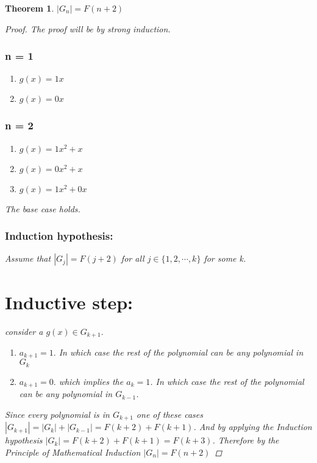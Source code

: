 \documentclass{article}
\newtheorem{theorem}{Theorem}
\begin{document}
    
    

    
    \begin{theorem}
        $|G_n|= F(n+2)$ 
        \begin{proof}
            The proof will be by strong induction.
            \subsubsection*{n = 1}
                \begin{enumerate}
                    \item $g(x) = 1x$
                    \item $g(x) = 0x$
                \end{enumerate}
            \subsubsection*{n = 2}
                \begin{enumerate}
                    \item $g(x) =  1x^2 + x $
                    \item $g(x) =  0x^2 + x $
                    \item $g(x) = 1x^2 + 0x$
                \end{enumerate}
            The base case holds. 
        \subsubsection*{Induction hypothesis:}
                Assume that $|G_j| = F(j+2)$ for all $j \in \{1,2, \cdots, k\} $ for some k.
        \section*{Inductive step:}
                consider a $g(x) \in G_{k+1}$.
                \begin{enumerate}[label= \textbf{Case \arabic*.}]
                    \item $a_{k+1}=1.$ In which case the rest of the polynomial can be any polynomial in $G_k$
                    \item  $a_{k+1}=0.$ which implies the $a_k=1$. In which case the rest of the polynomial can be any polynomial in $G_{k-1}$.
                \end{enumerate}
                Since every polynomial is in $G_{k+1}$ one of these cases $|G_{k+1}| = |G_{k}| + |G_{k-1}| = F(k+2) + F(k+1)$.
                And by applying the Induction hypothesis $|G_k| = F(k+2) + F(k+1)= F(k+3)$.
            Therefore by the Principle of Mathematical Induction $|G_n| = F(n+2)$

        \end{proof}
        
    \end{theorem}
    
\end{document}
